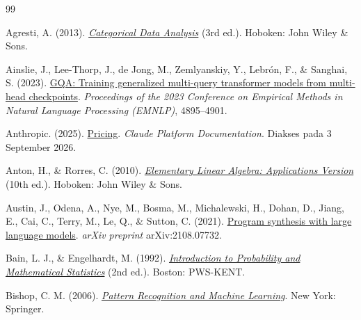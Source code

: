 \begin{thebibliography}{99}

Agresti, A. (2013).
\href{https://archive.org/details/categoricaldataa0000agre}{\emph{Categorical
Data Analysis}} (3rd ed.). Hoboken: John Wiley \& Sons.

Ainslie, J., Lee-Thorp, J., de Jong, M., Zemlyanskiy, Y., Lebr\'{o}n, F., \&
Sanghai, S. (2023).
\href{https://arxiv.org/abs/2305.13245}{GQA: Training generalized multi-query
transformer models from multi-head checkpoints}. \emph{Proceedings of the 2023
Conference on Empirical Methods in Natural Language Processing (EMNLP)},
4895--4901.

Anthropic. (2025).
\href{https://docs.claude.com/en/docs/about-claude/pricing}{Pricing}.
\emph{Claude Platform Documentation}. Diakses pada 3 September 2026.

Anton, H., \& Rorres, C. (2010).
\href{https://archive.org/details/elementarylinea000anto}{\emph{Elementary
Linear Algebra: Applications Version}} (10th ed.). Hoboken: John Wiley \& Sons.

Austin, J., Odena, A., Nye, M., Bosma, M., Michalewski, H., Dohan, D.,
Jiang, E., Cai, C., Terry, M., Le, Q., \& Sutton, C. (2021).
\href{https://arxiv.org/abs/2108.07732}{Program synthesis with large language
models}. \emph{arXiv preprint} arXiv:2108.07732.

Bain, L. J., \& Engelhardt, M. (1992).
\href{https://archive.org/details/introductiontopr0000bain}{\emph{Introduction
to Probability and Mathematical Statistics}} (2nd ed.). Boston: PWS-KENT.

Bishop, C. M. (2006).
\href{https://www.microsoft.com/en-us/research/uploads/prod/2006/01/Bishop-Pattern-Recognition-and-Machine-Learning-2006.pdf}{\emph{Pattern
Recognition and Machine Learning}}. New York: Springer.


\end{thebibliography}
